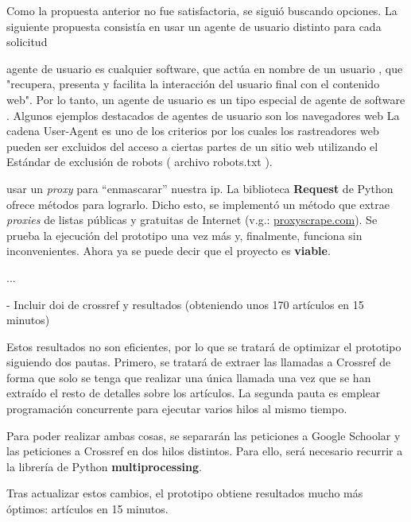 Como la propuesta anterior no fue satisfactoria, se siguió buscando opciones. La siguiente propuesta consistía en usar un agente de usuario distinto para cada solicitud

agente de usuario es cualquier software, que actúa en nombre de un usuario , que "recupera, presenta y facilita la interacción del usuario final con el contenido web". Por lo tanto, un agente de usuario es un tipo especial de agente de software .
Algunos ejemplos destacados de agentes de usuario son los navegadores web
La cadena User-Agent es uno de los criterios por los cuales los rastreadores web pueden ser excluidos del acceso a ciertas partes de un sitio web utilizando el Estándar de exclusión de robots ( archivo robots.txt ).

usar un \textit{proxy} para ``enmascarar'' nuestra ip. La biblioteca \textbf{Request} de Python ofrece métodos para lograrlo. Dicho esto, se implementó un método que extrae \textit{proxies} de listas públicas y gratuitas de Internet (v.g.: \href{https://www.proxyscrape.com/free-proxy-list}{proxyscrape.com}). Se prueba la ejecución del prototipo una vez más y, finalmente, funciona sin inconvenientes. Ahora ya se puede decir que el proyecto es \textbf{viable}.






...


- Incluir doi de crossref y resultados (obteniendo unos 170 artículos en 15 minutos)

Estos resultados no son eficientes, por lo que se tratará de optimizar el prototipo siguiendo dos pautas. Primero, se tratará de extraer las llamadas a Crossref de forma que solo se tenga que realizar una única llamada una vez que se han extraído el resto de detalles sobre los artículos. La segunda pauta es emplear programación concurrente para ejecutar varios hilos al mismo tiempo. 

Para poder realizar ambas cosas, se separarán las peticiones a Google Schoolar y las peticiones a Crossref en dos hilos distintos. Para ello, será necesario recurrir a la librería de Python \textbf{multiprocessing}.

Tras actualizar estos cambios, el prototipo obtiene resultados mucho más óptimos: artículos en 15 minutos.


